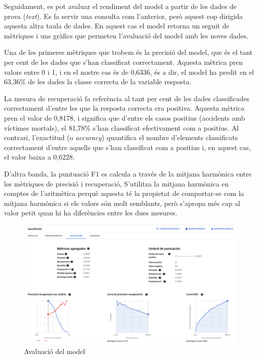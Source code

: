 \documentclass[12pt,longbibliography]{article}
\theoremstyle{definition}
\theoremstyle{remark}
\begin{document}
Seguidament, es pot avaluar el rendiment del model a partir de les dades de prova (\emph{text}). Es fa servir una consulta com l'anterior, però aquest cop dirigida aquesta altra taula de dades. En aquest cas el model retorna un seguit de mètriques i uns gràfics que permeten l'avaluació del model amb les noves dades.



Una de les primeres mètriques que trobem és la precisió del model, que és el tant per cent de les dades que s'han classificat correctament. Aquesta mètrica pren valors entre 0 i 1, i en el nostre cas és de 0,6336, és a dir, el model ha predit en el 63,36\% de les dades la classe correcta de la variable resposta. 



La mesura de recuperació fa referència al tant per cent de les dades classificades correctament d'entre les que la resposta correcta era positiva. Aquesta mètrica pren el valor de 0,8178, i significa que d'entre els casos positius (accidents amb víctimes mortals), el 81,78\% s'han classificat efectivament com a positius. Al contrari, l'exactitud (o \emph{accuracy}) quantifica el nombre d'elements classificats correctament d'entre aquells que s'han classificat com a positius i, en aquest cas, el valor baixa a 0,6228.



D'altra banda, la puntuació F1 es calcula a través de la mitjana harmònica entre les mètriques de precisió i recuperació, S'utilitza la mitjana harmònica en comptes de l'aritmètica perquè aquesta té la propietat de comportar-se com la mitjana harmònica si els valors són molt semblants, però s'apropa més cap al valor petit quan hi ha diferències entre les dues mesures.


\begin{figure}[H]
\begin{center}
\includegraphics[width=16cm]{log2}
\end{center}
\caption{Avaluació del model}
\label{fig:log2}
\end{figure}
\end{document}
